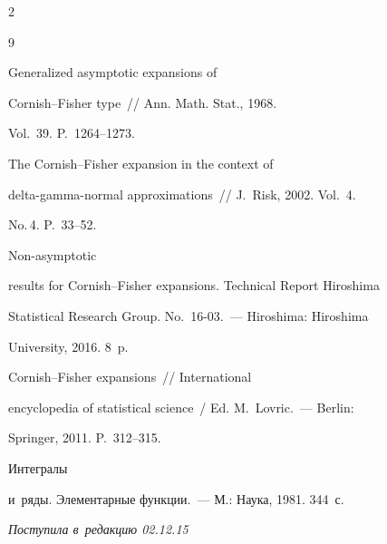 \begin{multicols}{2}
{{\begin{thebibliography}{9}

 Generalized asymptotic expansions of

Cornish--Fisher type~// Ann. Math. Stat., 1968.

Vol.~39. P.~1264--1273.


 The Cornish--Fisher expansion in the context of

delta-gamma-normal approximations~// J.~Risk, 2002. Vol.~4.

No.\,4. P.~33--52.




  Non-asymptotic

results for Cornish--Fisher expansions. Technical Report Hiroshima

Statistical Research Group. No.~16-03.~--- Hiroshima: Hiroshima

University, 2016. 8~p. 




  Cornish--Fisher expansions~// International

encyclopedia of statistical science~/ Ed. M.~Lovric.~--- Berlin:

Springer, 2011. P.~312--315.




  Интегралы 

и~ряды. Элементарные функции.~--- М.: Наука, 1981. 344~с.

\end{thebibliography}



 }

 }



\end{multicols}



\vspace*{-6pt}



\hfill{\small\textit{Поступила в~редакцию 02.12.15}}



\vspace*{4pt}



